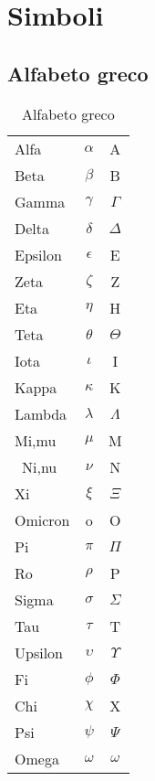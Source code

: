 \chapter{Simboli}
\label{cha:simboli}
\minitoc
\mtcskip                                %
\minilof                                %
\mtcskip                                %
\minilot
\section{Alfabeto greco}
\label{sec:AlfabetoGreco}

\begin{table}[h!]
\centering
\begin{tabular}{lcc}
\toprule
Alfa&$\alpha$&A\\
Beta&$\beta$&B\\
Gamma&$\gamma$&$\Gamma$\\
Delta&$\delta$&$\Delta$\\
Epsilon&$\epsilon$&E\\
Zeta&$\zeta$&Z\\
Eta&$\eta$&H\\
Teta&$\theta$&$\Theta$\\
Iota&$\iota$&I\\
Kappa&$\kappa$&K\\
Lambda&$\lambda$&$\Lambda$\\
Mi,mu&$\mu$&M\\\
Ni,nu&$\nu$&N\\
Xi&$\xi$&$\Xi$\\
Omicron&o&O\\
Pi&$\pi$&$\Pi$\\
Ro&$\rho$&P\\
Sigma&$\sigma$&$\Sigma$\\
Tau&$\tau$&T\\
Upsilon&$\upsilon$&$\Upsilon$\\
Fi&$\phi$&$\Phi$\\
Chi&$\chi$&X\\
Psi&$\psi$&$\Psi$\\
Omega&$\omega$&$\omega$\\
\bottomrule	
\end{tabular}
\caption{Alfabeto greco}
\label{Tab:alfabetogreco}
\end{table}
